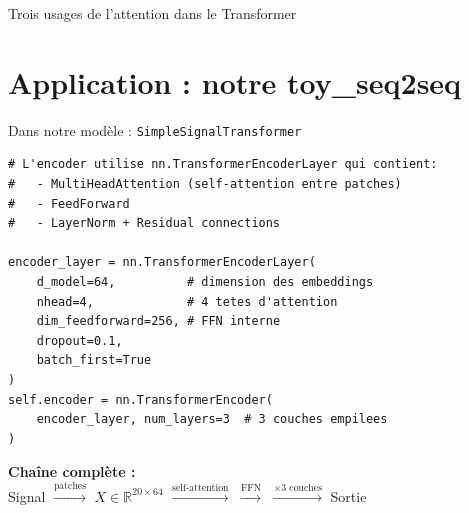 \documentclass[aspectratio=169, 11pt]{beamer}
\begin{document}
\begin{frame}{Trois usages de l'attention dans le Transformer}
\vspace{0.8em}

\begin{center}
\end{center}
\end{frame}

\section{Application : notre toy\_seq2seq}

\begin{frame}[fragile]{Dans notre modèle : \texttt{SimpleSignalTransformer}}
\begin{lstlisting}[style=python, title={\texttt{src/examples/toy\_seq2seq.py} --- Le modèle utilise l'attention}]
# L'encoder utilise nn.TransformerEncoderLayer qui contient:
#   - MultiHeadAttention (self-attention entre patches)
#   - FeedForward
#   - LayerNorm + Residual connections

encoder_layer = nn.TransformerEncoderLayer(
    d_model=64,          # dimension des embeddings
    nhead=4,             # 4 tetes d'attention
    dim_feedforward=256, # FFN interne
    dropout=0.1,
    batch_first=True
)
self.encoder = nn.TransformerEncoder(
    encoder_layer, num_layers=3  # 3 couches empilees
)
\end{lstlisting}

\vspace{0.3em}
\textbf{Chaîne complète :} \\
Signal $\xrightarrow{\text{patches}}$ $X \in \mathbb{R}^{20 \times 64}$ $\xrightarrow{\text{self-attention}}$ $\xrightarrow{\text{FFN}}$ $\xrightarrow{\times 3 \text{ couches}}$ Sortie
\end{frame}
\end{document}

